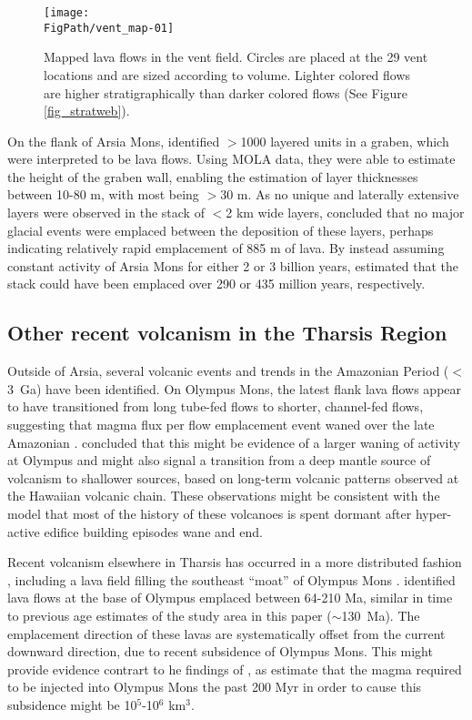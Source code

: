 \begin{figure}
\centering
\texttt{[image: \\FigPath/vent\_map-01]}
\caption[Mapped lava flows in the Arsia Mons vent field.]{Mapped lava flows in the vent field. Circles are placed at the 29 vent locations and are sized according to volume. Lighter colored flows are higher stratigraphically than darker colored flows (See Figure \ref{fig_stratweb}).}
\label{fig_lavamap}
\end{figure}

On the flank of Arsia Mons, \citet{mouginis2008lava} identified $>$1000 layered units in a graben, which were interpreted to be lava flows. Using MOLA data, they were able to estimate the height of the graben wall, enabling the estimation of layer thicknesses between 10-80 m, with most being $>$30 m. As no unique and laterally extensive layers were observed in the stack of $<$2 km wide layers, \citet{mouginis2008lava} concluded that no major glacial events were emplaced between the deposition of these layers, perhaps indicating relatively rapid emplacement of 885 m of lava. By instead assuming constant activity of Arsia Mons for either 2 or 3 billion years, \citet{mouginis2008lava} estimated that the stack could have been emplaced over 290 or 435 million years, respectively. 

\subsection{Other recent volcanism in the Tharsis Region}

Outside of Arsia, several volcanic events and trends in the Amazonian Period ($<$3~Ga) have been identified. On Olympus Mons, the latest flank lava flows appear to have transitioned from long tube-fed flows to shorter, channel-fed flows, suggesting that magma flux per flow emplacement event waned over the late Amazonian \citep{bleacher2007olympus}. \citet{bleacher2007olympus} concluded that this might be evidence of a larger waning of activity at Olympus and might also signal a transition from a deep mantle source of volcanism to shallower sources, based on long-term volcanic patterns observed at the Hawaiian volcanic chain. These observations might be consistent with the \citet{wilson2001evidence} model that most of the history of these volcanoes is spent dormant after hyper-active edifice building episodes wane and end.

Recent volcanism elsewhere in Tharsis has occurred in a more distributed fashion \citep{hauber2011very}, including a lava field filling the southeast ``moat'' of Olympus Mons \citep{chadwick2015late}. \citet{chadwick2015late} identified lava flows at the base of Olympus emplaced between 64-210 Ma, similar in time to previous age estimates of the study area in this paper ($\sim$130~Ma). The emplacement direction of these lavas are systematically offset from the current downward direction, due to recent subsidence of Olympus Mons. This might provide evidence contrart to he findings of \citet{bleacher2007olympus}, as \citet{chadwick2015late} estimate that the magma required to be injected into Olympus Mons the past 200 Myr in order to cause this subsidence might be 10$^5$-10$^6$ km$^3$.

